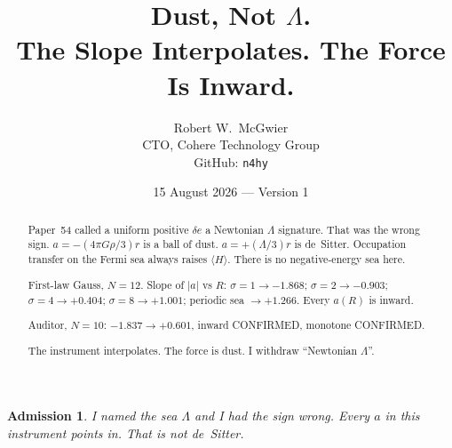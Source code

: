 \documentclass[11pt]{article}
\title{\textbf{Dust, Not $\Lambda$.\\
The Slope Interpolates. The Force Is Inward.}}
\author{Robert W.\ McGwier\\
\small CTO, Cohere Technology Group\\
\small GitHub: \texttt{n4hy}}
\date{15 August 2026 --- Version 1}
\newtheorem*{admission}{Admission}
\begin{document}
\maketitle

\begin{abstract}
\noindent
Paper~54 called a uniform positive $\delta e$ a Newtonian
$\Lambda$ signature. That was the wrong sign.
$a=-(4\pi G\rho/3)r$ is a ball of dust.
$a=+(\Lambda/3)r$ is de~Sitter. Occupation transfer on
the Fermi sea always raises $\langle H\rangle$. There is
no negative-energy sea here.

First-law Gauss, $N=12$. Slope of $|a|$ vs $R$:
$\sigma=1\to -1.868$; $\sigma=2\to -0.903$;
$\sigma=4\to +0.404$; $\sigma=8\to +1.001$;
periodic sea $\to +1.266$. Every $a(R)$ is inward.

Auditor, $N=10$: $-1.837\to +0.601$, inward CONFIRMED,
monotone CONFIRMED.

The instrument interpolates. The force is dust. I
withdraw ``Newtonian $\Lambda$''.
\end{abstract}

\begin{admission}
I named the sea $\Lambda$ and I had the sign wrong.
Every $a$ in this instrument points in. That is not
de~Sitter.
\end{admission}
\end{document}
